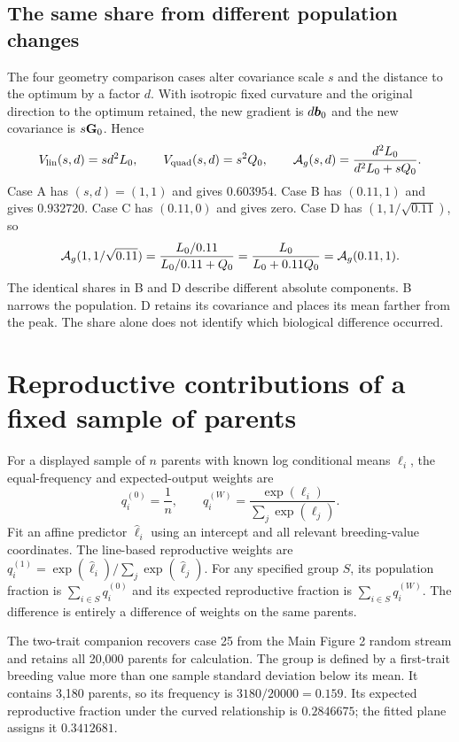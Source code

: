 \subsection{The same share from different population changes}
\label{worked:comparison}

The four geometry comparison cases alter covariance scale $s$ and the distance to the optimum by a factor $d$. With isotropic fixed curvature and the original direction to the optimum retained, the new gradient is $d\boldsymbol{b}_0$ and the new covariance is $s\mathbf{G}_0$. Hence
\[
 V_{\mathrm{lin}}(s,d)=sd^2L_0,\qquad
 V_{\mathrm{quad}}(s,d)=s^2Q_0,\qquad
 \mathcal A_g(s,d)=\frac{d^2L_0}{d^2L_0+sQ_0}.
\]
Case A has $(s,d)=(1,1)$ and gives $0.603954$. Case B has $(0.11,1)$ and gives $0.932720$. Case C has $(0.11,0)$ and gives zero. Case D has $(1,1/\sqrt{0.11})$, so
\[
 \mathcal A_g(1,1/\sqrt{0.11})
 =\frac{L_0/0.11}{L_0/0.11+Q_0}
 =\frac{L_0}{L_0+0.11Q_0}
 =\mathcal A_g(0.11,1).
\]
The identical shares in B and D describe different absolute components. B narrows the population. D retains its covariance and places its mean farther from the peak. The share alone does not identify which biological difference occurred.

\section{Reproductive contributions of a fixed sample of parents}
\label{worked:parental}

For a displayed sample of $n$ parents with known log conditional means $\ell_i$, the equal-frequency and expected-output weights are
\[
 q_i^{(0)}=\frac1n,\qquad
 q_i^{(W)}=\frac{\exp(\ell_i)}{\sum_j\exp(\ell_j)}.
\]
Fit an affine predictor $\widehat\ell_i$ using an intercept and all relevant breeding-value coordinates. The line-based reproductive weights are
$q_i^{(1)}=\exp(\widehat\ell_i)/\sum_j\exp(\widehat\ell_j)$.
For any specified group $S$, its population fraction is
$\sum_{i\in S}q_i^{(0)}$ and its expected reproductive fraction is
$\sum_{i\in S}q_i^{(W)}$. The difference is entirely a difference of weights on the same parents.

The two-trait companion recovers case 25 from the Main Figure 2 random stream and retains all 20,000 parents for calculation. The group is defined by a first-trait breeding value more than one sample standard deviation below its mean. It contains 3,180 parents, so its frequency is $3180/20000=0.159$. Its expected reproductive fraction under the curved relationship is $0.2846675$; the fitted plane assigns it $0.3412681$.

